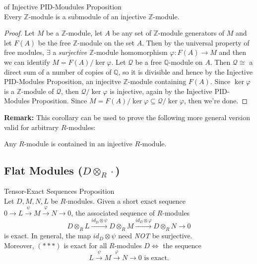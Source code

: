 \begin{corollary}{of Injective PID-Moudules Proposition}\\
Every $\mathbb{Z}$-module is a submodule of an injective $\mathbb{Z}$-module.
\end{corollary}

\begin{proof}
    Let $M$ be a $\mathbb{Z}$-module, let $A$ be any set of $\mathbb{Z}$-module generators of $M$ and let $F(A)$ be the free $\mathbb{Z}$-module on the set $A$. Then by the universal property of free modules, $\exists$ a \textit{surjective} $\mathbb{Z}$-module homomorphism $\varphi :F(A) \to M$ and then we can identify $M= F(A) /\ker \varphi$. Let $\mathcal{Q}$ be a free $\mathbb{Q}$-module on $A$. Then $\mathcal{Q} \cong$ a direct sum of a number of copies of $\mathbb{Q}$, so it is divisible and hence by the Injective PID-Modules Proposition, an injecitve $\mathbb{Z}$-module containing $F(A)$. Since $\ker \varphi$ is a $\mathbb{Z}$-module of $\mathcal{Q}$, then $\mathcal{Q}/ \ker\varphi$ is injective, again by the Injective PID-Modules Proposition. Since $M=F(A) /\ker\varphi \subseteq \mathcal{Q} /\ker\varphi$, then we're done.
\end{proof}

\noindent\textbf{Remark:} This corollary can be used to prove the following more general version valid for arbitrary $R$-modules:

\begin{theorem}
    Any $R$-module is contained in an injective $R$-module.
\end{theorem}

\subsection{Flat Modules ($D \otimes _R \cdot$)}

\begin{theorem}{Tensor-Exact Sequences Proposition}\\
Let $D,M,N,L$ be $R$-modules. Given a short exact sequence $0 \to L \overset{\psi}{\to} M \overset{\varphi}{\to} N\to 0$, the associated sequence of $R$-modules
\begin{equation*}
    D \otimes_R L \overset{id_D \otimes \psi}{\longrightarrow} D \otimes_R M \overset{id_D \otimes \varphi}{\longrightarrow} D\otimes_R N \to 0 \tag{***}
\end{equation*}
is exact. In general, the map $id_D \otimes \psi$ need \textit{NOT} be surjective.\\
Moreover, $(***)$ is exact for all $R$-modules $D \Leftrightarrow$ the sequence
\[
L \overset{\psi}{\to} M \overset{\varphi}{\to} N \to 0 \text{ is exact.}
\]
\end{theorem}

